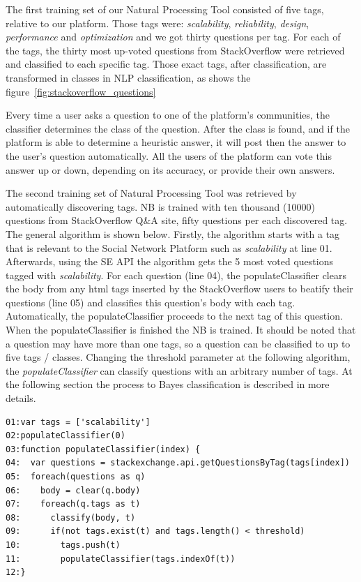 The first training set of our Natural Processing Tool consisted of five tags, relative to our platform. Those tags were: \emph{scalability}, \emph{reliability}, \emph{design}, \emph{performance} and \emph{optimization} and we got thirty questions per tag. For each of the tags, the thirty most up-voted questions from StackOverflow were retrieved and classified to each specific tag. Those exact tags, after classification, are transformed in classes in NLP classification, as shows the figure~\ref{fig:stackoverflow_questions}

Every time a user asks a question to one of the platform's communities, the classifier determines the class of the question. After the class is found, and if the platform is able to determine a heuristic answer, it will post then the answer to the user's question automatically. All the users of the platform can vote this answer up or down, depending on its accuracy, or provide their own answers.

The second training set of Natural Processing Tool was retrieved by automatically discovering tags. NB is trained with ten thousand (10000) questions from StackOverflow Q\&A site, fifty questions per each discovered tag. The general algorithm is shown below. Firstly, the algorithm starts with a tag that is relevant to the Social Network Platform such as \emph{scalability} at line 01. Afterwards, using the SE API the algorithm gets the 5 most voted questions tagged with \emph{scalability}. For each question (line 04), the populateClassifier clears the body from any html tags inserted by the StackOverflow users to beatify their questions (line 05) and classifies this question's body with each tag. Automatically, the populateClassifier proceeds to the next tag of this question. When the populateClassifier is finished the NB is trained. It should be noted that a question may have more than one tags, so a question can be classified to up to five tags / classes. Changing the threshold parameter at the following algorithm, the \emph{populateClassifier} can classify questions with an arbitrary number of tags. At the following section the process to Bayes classification is described in more details.

\begin{lstlisting} 
01:var tags = ['scalability']
02:populateClassifier(0)
03:function populateClassifier(index) {
04:  var questions = stackexchange.api.getQuestionsByTag(tags[index])
05:  foreach(questions as q)
06:    body = clear(q.body)
07:    foreach(q.tags as t)
08:    	 classify(body, t)
09:    	 if(not tags.exist(t) and tags.length() < threshold)
10:    	   tags.push(t)	  
11:        populateClassifier(tags.indexOf(t))
12:}		
\end{lstlisting}

